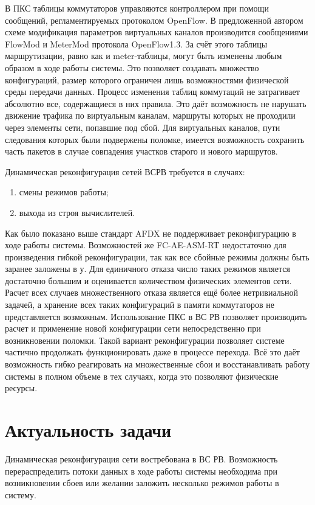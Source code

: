 \documentclass[12pt, a4paper]{article}
\begin{document}
В ПКС таблицы коммутаторов управляются контроллером при помощи сообщений, регламентируемых протоколом OpenFlow. В предложенной автором схеме модификация параметров виртуальных каналов производится сообщениями FlowMod и MeterMod протокола OpenFlow1.3. За счёт этого таблицы маршрутизации, равно как и meter-таблицы, могут быть изменены любым образом в ходе работы системы. Это позволяет создавать множество конфигураций, размер которого ограничен лишь возможностями физической среды передачи данных. Процесс изменения таблиц коммутаций не затрагивает абсолютно все, содержащиеся в них правила. Это даёт возможность не нарушать движение трафика по виртуальным каналам, маршруты которых не проходили через элементы сети, попавшие под сбой. Для виртуальных каналов, пути следования которых были подвержены поломке, имеется возможность сохранить часть пакетов в случае совпадения участков старого и нового маршрутов. 

Динамическая реконфигурация сетей ВСРВ требуется в случаях:
\begin{enumerate}
	\item смены режимов работы;
	\item выхода из строя вычислителей.
\end{enumerate}

Как было показано выше стандарт AFDX не поддерживает реконфигурацию в ходе работы системы. Возможностей же FC-AE-ASM-RT недостаточно для произведения гибкой реконфигурации, так как все сбойные режимы должны быть заранее заложены в у. Для единичного отказа число таких режимов является достаточно большим и оценивается количеством физических элементов сети. Расчет всех случаев множественного отказа является ещё более нетривиальной задачей, а хранение всех таких конфигураций в памяти коммутаторов не представляется возможным. Использование ПКС в ВС РВ позволяет производить расчет и применение новой конфигурации сети непосредственно при возникновении поломки. Такой вариант реконфигурации позволяет системе частично продолжать функционировать даже в процессе перехода. Всё это даёт возможность гибко реагировать на множественные сбои и восстанавливать работу системы в полном объеме в тех случаях, когда это позволяют физические ресурсы.


\section{Актуальность задачи}
Динамическая реконфигурация сети востребована в ВС РВ. Возможность перераспределить потоки данных в ходе работы системы необходима при возникновении сбоев или желании заложить несколько режимов работы в систему.
\end{document}
